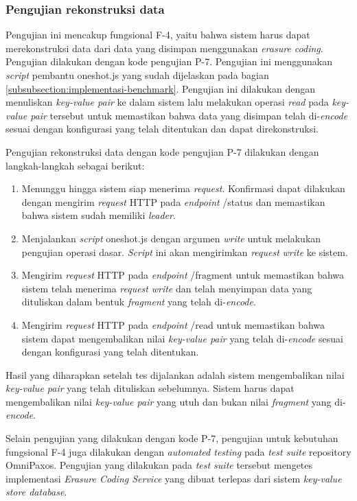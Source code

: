 \subsubsection{Pengujian rekonstruksi data}
\label{subsubsection:pengujian-rekonstruksi-data}

Pengujian ini mencakup fungsional F-4, yaitu bahwa sistem harus dapat merekonstruksi data dari data yang disimpan menggunakan \textit{erasure coding}. Pengujian dilakukan dengan kode pengujian P-7. Pengujian ini menggunakan \textit{script} pembantu oneshot.js yang sudah dijelaskan pada bagian \ref{subsubsection:implementasi-benchmark}. Pengujian ini dilakukan dengan menuliskan \textit{key-value pair} ke dalam sistem lalu melakukan operasi \textit{read} pada \textit{key-value pair} tersebut untuk memastikan bahwa data yang disimpan telah di-\textit{encode} sesuai dengan konfigurasi yang telah ditentukan dan dapat direkonstruksi.

Pengujian rekonstruksi data dengan kode pengujian P-7 dilakukan dengan langkah-langkah sebagai berikut:
\begin{enumerate}
  \item Menunggu hingga sistem siap menerima \textit{request}. Konfirmasi dapat dilakukan dengan mengirim \textit{request} HTTP pada \textit{endpoint} /status dan memastikan bahwa sistem sudah memiliki \textit{leader}.
  \item Menjalankan \textit{script} oneshot.js dengan argumen \textit{write} untuk melakukan pengujian operasi dasar. \textit{Script} ini akan mengirimkan \textit{request} \textit{write} ke sistem.
  \item Mengirim \textit{request} HTTP pada \textit{endpoint} /fragment untuk memastikan bahwa sistem telah menerima \textit{request} \textit{write} dan telah menyimpan data yang dituliskan dalam bentuk \textit{fragment} yang telah di-\textit{encode}.
  \item Mengirim \textit{request} HTTP pada \textit{endpoint} /read untuk memastikan bahwa sistem dapat mengembalikan nilai \textit{key-value pair} yang telah di-\textit{encode} sesuai dengan konfigurasi yang telah ditentukan.
\end{enumerate}

Hasil yang diharapkan setelah tes dijalankan adalah sistem mengembalikan nilai \textit{key-value pair} yang telah dituliskan sebelumnya. Sistem harus dapat mengembalikan nilai \textit{key-value pair} yang utuh dan bukan nilai \textit{fragment} yang di-\textit{encode}.

Selain pengujian yang dilakukan dengan kode P-7, pengujian untuk kebutuhan fungsional F-4 juga dilakukan dengan \textit{automated testing} pada \textit{test suite} repository OmniPaxos. Pengujian yang dilakukan pada \textit{test suite} tersebut mengetes implementasi \textit{Erasure Coding Service} yang dibuat terlepas dari sistem \textit{key-value store database}.